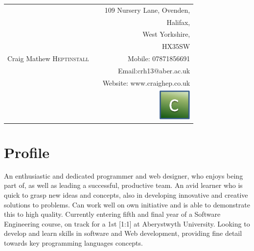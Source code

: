 \documentclass[a4paper,10pt]{article}
\begin{document}
\pagestyle{empty}

\begin{tabular}{l p{1.6cm} r}
 & &109 Nursery Lane, Ovenden,  \\
& &Halifax,   \\
& &West Yorkshire,  \\
& &HX35SW  \\
 \huge Craig Mathew \textsc{Heptinstall} &  &Mobile: 07871856691  \\
& & Email:crh13@aber.ac.uk\\
& & Website: www.craighep.co.uk \\[0.1cm]
&& \includegraphics[width=.8cm]{logo} 
\end{tabular}

%
\section{Profile}
An enthusiastic and dedicated programmer and web designer, who enjoys being part of, as well as leading a successful, productive team. An avid learner who is quick to grasp new ideas and concepts, also in developing innovative and creative solutions to problems. Can work well on own initiative and is able to demonstrate this to high quality. Currently entering fifth and final year of a Software Engineering course, on track for a 1st [1:1] at Aberystwyth University. Looking to develop and learn skills in software and Web development, providing fine detail towards key programming languages concepts.
\end{document}
